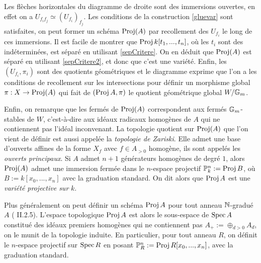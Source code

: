 Les flèches horizontales du diagramme de droite sont des immersions ouvertes, en effet on a $U_{f_if_j}\simeq (U_{f_i})_{f_j}$. Les conditions de la construction \ref{gluevar} sont satisfaites, on peut former un schéma $\operatorname{Proj}(A)$ par recollement des $U_{f_i}$ le long de ces immersions. Il est facile de montrer que $\operatorname{Proj} k[t_1,...,t_n]$, où les $t_i$ sont des indéterminées, est séparé en utilisant \ref{sepCritere}. On en déduit que $\operatorname{Proj}(A)$ est séparé en utilisant \ref{sepCritere2}, et donc que c'est une variété. Enfin, les $(U_{f_i},\pi_i)$ sont des quotients géométriques et le diagramme exprime que l'on a les conditions de recollement sur les intersections pour définir un morphisme global $\pi:X\rightarrow\operatorname{Proj}(A)$ qui fait de $(\operatorname{Proj} A,\pi)$ le quotient géométrique global $W/\mathbb{G}_m$. 

Enfin, on remarque que les fermés de $\operatorname{Proj}(A)$ correspondent aux fermés $\mathbb{G}_m$-stables de $W$, c'est-à-dire aux idéaux radicaux homogènes de $A$ qui ne contiennent pas l'idéal inconvenant. La topologie quotient sur $\operatorname{Proj}(A)$ que l'on vient de définir est aussi appelée la \textit{topologie de Zariski}. Elle admet une base d'ouverts affines de la forme $X_f$ avec $f\in A_{>0}$ homogène, ils sont appelés les \textit{ouverts principaux}. Si $A$ admet $n+1$ générateurs homogènes de degré $1$, alors $\operatorname{Proj}(A)$ admet une immersion fermée dans le $n$-espace projectif $\mathbb{P}^n_k:=\operatorname{Proj} B$, où $B:=k[x_0,...,x_n]$ avec la graduation standard. On dit alors que $\operatorname{Proj} A$ est une \textit{variété projective sur} $k$. 


\begin{rem}
Plus généralement on peut définir un schéma $\operatorname{Proj} A$ pour tout anneau $\mathbb{N}$-gradué $A$ (\cite{Hartshorne} II.2.5). L'espace topologique $\operatorname{Proj} A$ est alors le sous-espace de $\operatorname{Spec} A$ constitué des idéaux premiers homogènes qui ne contiennent pas $A_+:=\oplus_{d>0}A_d$, on le munit de la topologie induite. En particulier, pour tout anneau $R$, on définit le $n$-espace projectif sur $\operatorname{Spec} R$ en posant $\mathbb{P}^n_R:=\operatorname{Proj} R[x_0,...,x_n]$, avec la graduation standard.
\end{rem}
